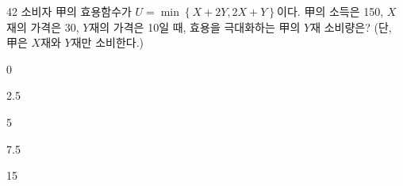 \begin{question}{42}
소비자 甲의 효용함수가 ${ U=\min \left\{ X+2Y, 2X+Y \right\} }$이다. 甲의 소득은 150, ${ X }$재의 가격은 30, ${ Y }$재의 가격은 10일 때, 효용을 극대화하는 甲의 ${ Y }$재 소비량은? (단, 甲은 ${ X }$재와 ${ Y }$재만 소비한다.)
\begin{choices}
  \item 0
  \item 2.5
  \item 5
  \item 7.5
  \item 15
\end{choices}
\end{question}
